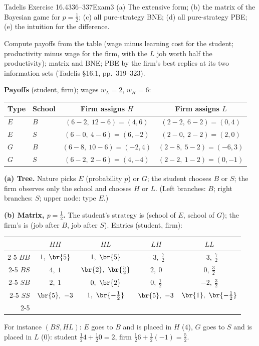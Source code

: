 \begin{exsol}{Tadelis Exercise 16.4}{336--337}{Exam}{3}
\asked (a) The extensive form; (b) the matrix of the Bayesian game for $p = \frac12$; (c) all
pure-strategy BNE; (d) all pure-strategy PBE; (e) the intuition for the difference.

\method Compute payoffs from the table (wage minus learning cost for the student; productivity
minus wage for the firm, with the $L$ job worth half the productivity); matrix and BNE; PBE by the
firm's best replies at its two information sets (Tadelis \S16.1, pp.~319--323).

\solution \textbf{Payoffs} (student, firm); wages $w_L = 2$, $w_H = 6$:
\begin{center}
\begin{tabular}{llcc}
\toprule
Type & School & Firm assigns $H$ & Firm assigns $L$ \\
\midrule
$E$ & $B$ & $(6 - 2,\ 12 - 6) = (4, 6)$ & $(2 - 2,\ 6 - 2) = (0, 4)$ \\
$E$ & $S$ & $(6 - 0,\ 4 - 6) = (6, -2)$ & $(2 - 0,\ 2 - 2) = (2, 0)$ \\
$G$ & $B$ & $(6 - 8,\ 10 - 6) = (-2, 4)$ & $(2 - 8,\ 5 - 2) = (-6, 3)$ \\
$G$ & $S$ & $(6 - 2,\ 2 - 6) = (4, -4)$ & $(2 - 2,\ 1 - 2) = (0, -1)$ \\
\bottomrule
\end{tabular}
\end{center}
\textbf{(a) Tree.} Nature picks $E$ (probability $p$) or $G$; the student chooses $B$ or $S$; the firm
observes only the school and chooses $H$ or $L$.
(Left branches: $B$; right branches: $S$; upper node: type $E$.)

\textbf{(b) Matrix, $p = \frac12$.} The student's strategy is (school of $E$, school of $G$); the
firm's is (job after $B$, job after $S$). Entries (student, firm):
\begin{center}
\begin{tabular}{r|c|c|c|c|}
\multicolumn{1}{r}{} & \multicolumn{1}{c}{$HH$} & \multicolumn{1}{c}{$HL$} & \multicolumn{1}{c}{$LH$} & \multicolumn{1}{c}{$LL$} \\ \cline{2-5}
$BB$ & $1,\ \br{5}$ & $1,\ \br{5}$ & $-3,\ \tfrac{7}{2}$ & $-3,\ \tfrac{7}{2}$ \\ \cline{2-5}
$BS$ & $4,\ 1$ & $\br{2},\ \br{\tfrac{5}{2}}$ & $2,\ 0$ & $0,\ \tfrac{3}{2}$ \\ \cline{2-5}
$SB$ & $2,\ 1$ & $0,\ \br{2}$ & $0,\ \tfrac{1}{2}$ & $-2,\ \tfrac{3}{2}$ \\ \cline{2-5}
$SS$ & $\br{5},\ -3$ & $1,\ \br{-\tfrac{1}{2}}$ & $\br{5},\ -3$ & $\br{1},\ \br{-\tfrac{1}{2}}$ \\ \cline{2-5}
\end{tabular}
\end{center}
For instance $(BS, HL)$: $E$ goes to $B$ and is placed in $H$ ($4$), $G$ goes to $S$ and is placed in $L$
($0$): student $\frac12 4 + \frac12 0 = 2$, firm $\frac12 6 + \frac12(-1) = \frac52$.


\end{exsol}
